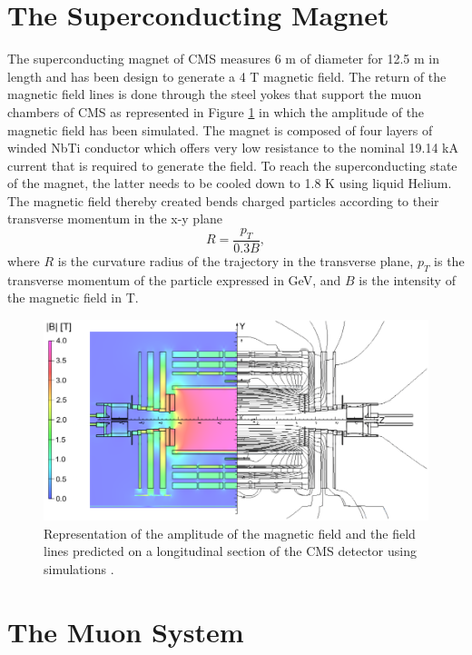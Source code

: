   \section{The Superconducting Magnet}

    The superconducting magnet of CMS measures 6 m of diameter for 12.5 m in length and has been design to generate a 4 T magnetic field. The return of the magnetic field lines is done through the steel yokes that support the muon chambers of CMS as represented in Figure  \ref{fig:I-3-cms-magnet} in which the amplitude of the magnetic field has been simulated. The magnet is composed of four layers of winded NbTi conductor which offers very low resistance to the nominal 19.14 kA current that is required to generate the field. To reach the superconducting state of the magnet, the latter needs to be cooled down to 1.8 K using liquid Helium. The magnetic field thereby created bends charged particles according to their transverse momentum in the x-y plane
    \begin{equation}
      R = \frac{p_T}{0.3 B} ,
    \end{equation}
    where $ R $ is the curvature radius of the trajectory in the transverse plane, $ p_T $ is the transverse momentum of the particle expressed in GeV, and $ B $ is the intensity of the magnetic field in T.

    \begin{figure}[h!]
      \centering
      \includegraphics[width=\textwidth]{img/I-3-cms/magnet.png}
      \caption{Representation of the amplitude of the magnetic field and the field lines predicted on a longitudinal section of the CMS detector using simulations \cite{Chatrchyan:2009si}.}
      \label{fig:I-3-cms-magnet}
    \end{figure}

  \section{The Muon System}

